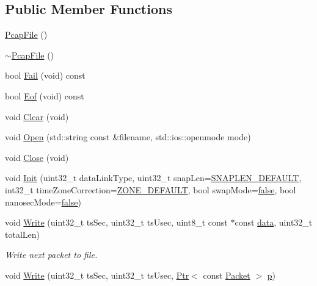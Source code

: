 \subsection*{Public Member Functions}
\begin{DoxyCompactItemize}
\item 
\hyperlink{classns3_1_1PcapFile_a6bfa1cf38e6845f9d2e77e3c034ed90d}{Pcap\+File} ()
\item 
\hyperlink{classns3_1_1PcapFile_ae70ee5d4e70678f92635233e36288764}{$\sim$\+Pcap\+File} ()
\item 
bool \hyperlink{classns3_1_1PcapFile_a2e00aa080890a0c9c3e9f5bd2d6c21d5}{Fail} (void) const 
\item 
bool \hyperlink{classns3_1_1PcapFile_ad8b9cd552beb5e1c348e04c98d3daffa}{Eof} (void) const 
\item 
void \hyperlink{classns3_1_1PcapFile_a4b593422b0941d936d98635151d1d8ce}{Clear} (void)
\item 
void \hyperlink{classns3_1_1PcapFile_a064e8494e28e823d0bb4e40549f9f483}{Open} (std\+::string const \&filename, std\+::ios\+::openmode mode)
\item 
void \hyperlink{classns3_1_1PcapFile_ad3b6c28d464742ee1fa3a64628339a5b}{Close} (void)
\item 
void \hyperlink{classns3_1_1PcapFile_a80c8adea1baa66e3f730df2927b0fc9b}{Init} (uint32\+\_\+t data\+Link\+Type, uint32\+\_\+t snap\+Len=\hyperlink{classns3_1_1PcapFile_ac5fda3d19b0cd0f85b0c151c2397681b}{S\+N\+A\+P\+L\+E\+N\+\_\+\+D\+E\+F\+A\+U\+LT}, int32\+\_\+t time\+Zone\+Correction=\hyperlink{classns3_1_1PcapFile_abd695588f972dc80b0c928aeda466dc0}{Z\+O\+N\+E\+\_\+\+D\+E\+F\+A\+U\+LT}, bool swap\+Mode=\hyperlink{lte__cqi__generation_8m_ab1bef239d413c4da139c4bac92cd657a}{false}, bool nanosec\+Mode=\hyperlink{lte__cqi__generation_8m_ab1bef239d413c4da139c4bac92cd657a}{false})
\item 
void \hyperlink{classns3_1_1PcapFile_a3920f5bae95ca0021875e6e9c2630ccf}{Write} (uint32\+\_\+t ts\+Sec, uint32\+\_\+t ts\+Usec, uint8\+\_\+t const $\ast$const \hyperlink{topology-example-sim_8cc_a26c65296e316af77b787dc77469bb2a4}{data}, uint32\+\_\+t total\+Len)
\begin{DoxyCompactList}\small\item\em Write next packet to file. \end{DoxyCompactList}\item 
void \hyperlink{classns3_1_1PcapFile_a6b334e0b95629bf0897949e33e54479d}{Write} (uint32\+\_\+t ts\+Sec, uint32\+\_\+t ts\+Usec, \hyperlink{classns3_1_1Ptr}{Ptr}$<$ const \hyperlink{classns3_1_1Packet}{Packet} $>$ \hyperlink{lte__link__budget__x2__handover__measures_8m_ac9de518908a968428863f829398a4e62}{p})

\end{DoxyCompactItemize}
